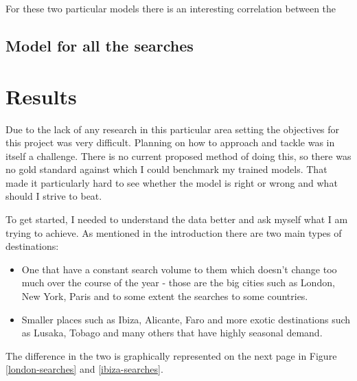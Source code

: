 \documentclass[minf,frontabs,twoside,singlespacing,parskip]{infthesis}
\begin{document}
For these two particular models there is an interesting correlation between the 


\section{Model for all the searches}




\chapter{Results}


Due to the lack of any research in this particular area setting the objectives for this project was very difficult. Planning on how to approach and tackle was in itself a challenge. There is no current proposed method of doing this, so there was no gold standard against which I could benchmark my trained models. That made it particularly hard to see whether the model is right or wrong and what should I strive to beat.


To get started, I needed to understand the data better and ask myself what I am trying to achieve. As mentioned in the introduction there are two main types of destinations:

\begin{itemize}
\item One that have a constant search volume to them which doesn't change too much over the course of the year - those are the big cities such as London, New York, Paris and to some extent the searches to some countries. 
\item Smaller places such as Ibiza, Alicante, Faro and more exotic destinations such as Lusaka, Tobago and many others that have highly seasonal demand.
\end{itemize}
The difference in the two is graphically represented on the next page in Figure \ref{london-searches} and \ref{ibiza-searches}. 
\end{document}
